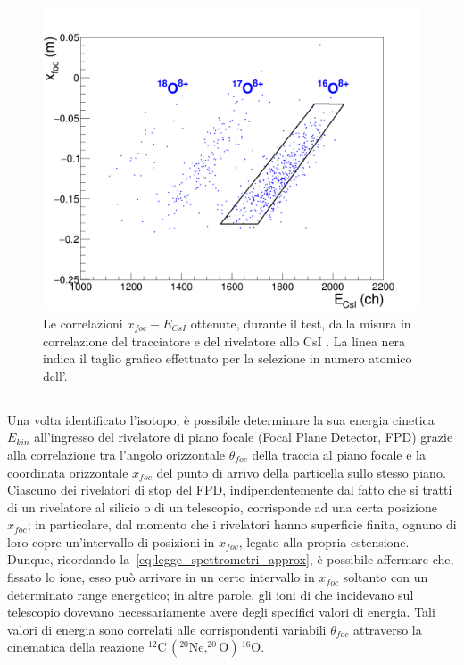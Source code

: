 \begin{figure} [!p]
	\centering
	\includegraphics[width=\textwidth, keepaspectratio]{Grafici_Tesi/Test/matrice_xfoc2_csi_taglio2.png}
	\caption{Le correlazioni $x_{foc} - E_{CsI}$ ottenute, durante il test, dalla misura in correlazione del tracciatore e del rivelatore allo CsI . La linea nera indica il taglio grafico effettuato per la selezione in numero atomico dell'.} \label{fig:xfoc2_csi_standard}
\end{figure}



\subsection{}

Una volta identificato l'isotopo, è possibile determinare la sua energia cinetica $E_{kin}$ all'ingresso del rivelatore di piano focale (Focal Plane Detector, FPD) grazie alla correlazione tra l'angolo orizzontale $\theta_{foc}$ della traccia al piano focale e la coordinata orizzontale $x_{foc}$ del punto di arrivo della particella sullo stesso piano.
Ciascuno dei rivelatori di stop del FPD, indipendentemente dal fatto che si tratti di un rivelatore al silicio o di un telescopio, corrisponde ad una certa posizione $x_{foc}$; in particolare, dal momento che i rivelatori hanno superficie finita, ognuno di loro copre un'intervallo di posizioni in $x_{foc}$, legato alla propria estensione.
Dunque, ricordando la~\ref{eq:legge_spettrometri_approx}, è possibile affermare che, fissato lo ione, esso può arrivare in un certo intervallo in $x_{foc}$ soltanto con un determinato range energetico; in altre parole, gli ioni di  che incidevano sul telescopio dovevano necessariamente avere degli specifici valori di energia.
Tali valori di energia sono correlati alle corrispondenti variabili $\theta_{foc}$ attraverso la cinematica della reazione $^{12}\mbox{C}\,  ( ^{20}\mbox{Ne}, ^{20}\mbox{O} ) \, ^{16}\mbox{O} $.

